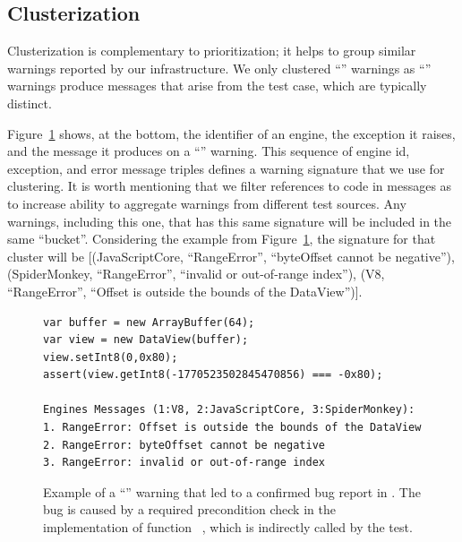 \documentclass[sigconf,review, anonymous]{acmart}
\begin{document}
\subsection{Clusterization}
\label{sec:clusterization}


Clusterization is complementary to prioritization; it helps to group
similar warnings reported by our infrastructure. We only clustered
``\lo'' warnings as ``\hi'' warnings produce messages that arise from
the test case, which are typically distinct.

Figure~\ref{fig:lo-truepositive} shows, at the bottom, the identifier
of an engine, the exception it raises, and the message it produces on
a ``\lo'' warning.  This sequence of engine id, exception, and error
message triples defines a warning signature that we use for
clustering. It is worth mentioning that we filter references to code
in messages as to increase ability to aggregate warnings from
different test sources. Any warnings, including this one, that has
this same signature will be included in the same
``bucket''. Considering the example from
Figure~\ref{fig:lo-truepositive}, the signature for that cluster will
be [(JavaScriptCore, ``RangeError'', ``byteOffset cannot be
  negative''), (SpiderMonkey, ``RangeError'', ``invalid or
  out-of-range index''), (V8, ``RangeError'', ``Offset is outside the
  bounds of the DataView'')]. 

\begin{figure}[t!]
  \centering
  \begin{lstlisting}
var buffer = new ArrayBuffer(64);
var view = new DataView(buffer);
view.setInt8(0,0x80);
assert(view.getInt8(-1770523502845470856) === -0x80);

Engines Messages (1:V8, 2:JavaScriptCore, 3:SpiderMonkey):
1. RangeError: Offset is outside the bounds of the DataView
2. RangeError: byteOffset cannot be negative
3. RangeError: invalid or out-of-range index
  \end{lstlisting}
  \caption{\label{fig:lo-truepositive}Example of a ``\lo'' warning
    that led to a confirmed bug report in \chakra. The bug is caused
    by a required precondition check in the implementation of function
    ~\cite{ecmas262-getviewvalue}, which is indirectly called by the test. }
\end{figure}
\end{document}
